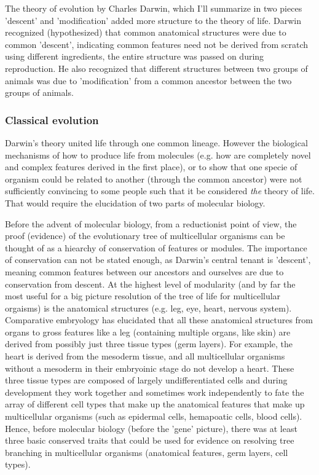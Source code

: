 The theory of evolution by Charles Darwin, which I'll summarize in two pieces 'descent' and 'modification' added  more structure to the theory of life.  Darwin recognized (hypothesized) that common anatomical structures were due to common 'descent', indicating common features need not be derived from scratch using different ingredients, the entire structure was passed on during reproduction.  He also recognized that different structures between two groups of animals was due to 'modification' from a common ancestor between the two groups of animals.

\subsubsection{Classical evolution}

Darwin's theory united life through one common lineage.  However the biological mechanisms of how to produce life from molecules (e.g. how are completely novel and complex features derived in the first place), or to show that one specie of organism could be related to another (through the common ancestor) were not sufficiently convincing to some people such that it be considered \textit{the} theory of life.  That would require the elucidation of two parts of molecular biology.  

Before the advent of molecular biology, from a reductionist point of view, the proof (evidence) of the evolutionary tree of multicellular organisms can be thought of as a hiearchy of conservation of features or modules.  The importance of conservation can not be stated enough, as Darwin's central tenant is 'descent', meaning common features between our ancestors and ourselves are due to conservation from descent.  At the highest level of modularity (and by far the most useful for a big picture resolution of the tree of life for multicellular orgaisms) is the anatomical structures (e.g. leg, eye, heart, nervous system).  Comparative embryology has elucidated that all these anatomical structures from organs to gross features like a leg (containing multiple organs, like skin) are derived from possibly just three tissue types (germ layers).  For example, the heart is derived from the mesoderm tissue, and all multicellular organisms without a mesoderm in their embryoinic stage do not develop a heart.  These three tissue types are composed of largely undifferentiated cells and during development they work together and sometimes work independently to fate the array of different cell types that make up the anatomical features that make up multicellular organisms (such as epidermal cells, hemapoatic cells, blood cells).  Hence, before molecular biology (before the 'gene' picture), there was at least three basic conserved traits that could be used for evidence on resolving tree branching in multicellular organisms (anatomical features, germ layers, cell types).
    
